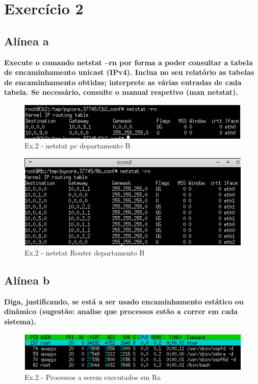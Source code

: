 \documentclass[a4paper]{report}
\begin{document}
\section{Exercício 2}

\subsection{Alínea a}
\textbf{Execute o comando netstat –rn por forma a poder consultar a tabela de
encaminhamento unicast (IPv4). Inclua no seu relatório as tabelas de encaminhamento
obtidas; interprete as várias entradas de cada tabela. Se necessário, consulte o manual
respetivo (man netstat).}

\begin{figure}[H]
    \centering 
    \includegraphics[width=\textwidth]{images/netstatPcEx2P2.png}
    \caption{Ex.2 - netstat pc departamento B}
    \label{fig:netstatPcEx2P2}
\end{figure}

\begin{figure}[H]
    \centering 
    \includegraphics[width=\textwidth]{images/netstatRouterEx2P2.png}
    \caption{Ex.2 - netstat Router departamento B}
    \label{fig:netstatRouterEx2P2}
\end{figure}

\subsection{Alínea b}
\textbf{Diga, justificando, se está a ser usado encaminhamento estático ou dinâmico
(sugestão: analise que processos estão a correr em cada sistema).}

\begin{figure}[H]
    \centering 
    \includegraphics[width=\textwidth]{images/htop2a.png}
    \caption{Ex.2 - Processos a serem executados em Ra}
    \label{fig:htop2a}
\end{figure}
\end{document}
